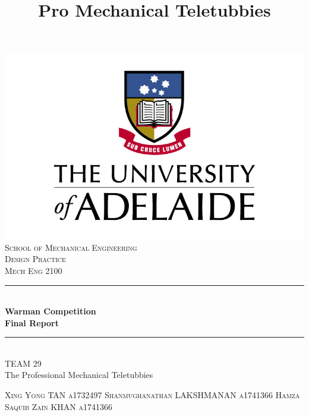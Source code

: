 \documentclass[12pt]{report}
\title{Pro Mechanical Teletubbies}
\begin{document}
	
\begin{titlepage}
\newcommand{\HRule}{\rule{\linewidth}{0.5mm}}

\center %

\includegraphics{UoA_logo.jpg}\\
\textsc{\large School of Mechanical Engineering}\\[1cm]
\textsc{\Huge Design Practice}\\
\textsc{\large Mech Eng 2100}\\


\HRule \\[0.4cm]
{ \Huge \bfseries Warman Competition}\\[0.2cm]
{ \Huge \bfseries Final Report}\\[0.1cm]
\HRule \\[-0.2cm]


\huge TEAM 29 \\ [-0.2cm]
\Large The Professional Mechanical Teletubbies \\[1 cm]

\begin{minipage}{0.5\textwidth}
\begin{flushleft} \small
  \textsc{Xing Yong TAN}
   \linebreak
 \textsc{a1732497}
 \linebreak
  \linebreak
  \textsc{Shanmughanathan LAKSHMANAN}
   \linebreak 
 \textsc{a1741366}
  \linebreak
  \linebreak
  \textsc{Hamza Saquib Zain KHAN}
  \linebreak
  \textsc{a1741366}
 

\end{flushleft}
\end{minipage}
\end{titlepage}
\end{document}

